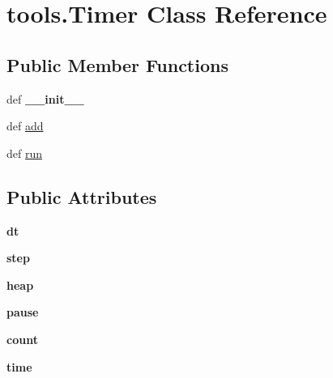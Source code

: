 \hypertarget{classtools_1_1_timer}{\section{tools.\-Timer \-Class \-Reference}
\label{classtools_1_1_timer}
}
\subsection*{\-Public \-Member \-Functions}
\begin{DoxyCompactItemize}
\item 
\hypertarget{classtools_1_1_timer_aa8eb0f7637ab77b3558633a24267ec12}{def {\bfseries \-\_\-\-\_\-init\-\_\-\-\_\-}}\label{classtools_1_1_timer_aa8eb0f7637ab77b3558633a24267ec12}

\item 
def \hyperlink{classtools_1_1_timer_a5f2a146060a63948098337885132c3cf}{add}
\item 
def \hyperlink{classtools_1_1_timer_ae3470afe22648a6bc6cd7104bb3fc4e2}{run}
\end{DoxyCompactItemize}
\subsection*{\-Public \-Attributes}
\begin{DoxyCompactItemize}
\item 
\hypertarget{classtools_1_1_timer_a4979bfdbf6635ea450ecefd1f3db623a}{{\bfseries dt}}\label{classtools_1_1_timer_a4979bfdbf6635ea450ecefd1f3db623a}

\item 
\hypertarget{classtools_1_1_timer_a893d0a9a5e7d031b0f1af5efc5743cc8}{{\bfseries step}}\label{classtools_1_1_timer_a893d0a9a5e7d031b0f1af5efc5743cc8}

\item 
\hypertarget{classtools_1_1_timer_a3023e0d71d6badac61bc599dcfd1eb8c}{{\bfseries heap}}\label{classtools_1_1_timer_a3023e0d71d6badac61bc599dcfd1eb8c}

\item 
\hypertarget{classtools_1_1_timer_ad498ee353df48ed8e3e018e0ed61bea4}{{\bfseries pause}}\label{classtools_1_1_timer_ad498ee353df48ed8e3e018e0ed61bea4}

\item 
\hypertarget{classtools_1_1_timer_a3b500aad25a782ff35fdc0a0c08b92ed}{{\bfseries count}}\label{classtools_1_1_timer_a3b500aad25a782ff35fdc0a0c08b92ed}

\item 
\hypertarget{classtools_1_1_timer_a57e5a80add7f6e9cbebefae90b737e04}{{\bfseries time}}\label{classtools_1_1_timer_a57e5a80add7f6e9cbebefae90b737e04}

\end{DoxyCompactItemize}


